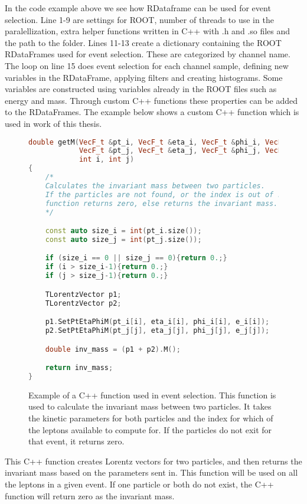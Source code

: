 In the code example above we see how RDataframe can be used for event selection. Line 1-9 are settings for ROOT, 
number of threads to use in the paralellization, extra helper functions written in C++ with .h and .so files and the path to the folder.
Lines 11-13 create a dictionary containing the ROOT RDataFrames used for event selection. These are categorized by channel name. 
The loop on line 15 does event selection for each channel sample, defining new variables in the RDataFrame, applying filters and creating histograms.
Some variables are constructed using variables already in the ROOT files such as energy and mass. Through custom C++ functions
these properties can be added to the RDataFrames. The example below shows a custom C++ function which is used in work of this thesis.

\begin{figure}[H]
    \centering
\begin{lstlisting}[language=C++, style=cppstyle, label={code:cpp_func_example}]
double getM(VecF_t &pt_i, VecF_t &eta_i, VecF_t &phi_i, VecF_t &e_i,
            VecF_t &pt_j, VecF_t &eta_j, VecF_t &phi_j, VecF_t &e_j,
            int i, int j)
{
    /* 
    Calculates the invariant mass between two particles.
    If the particles are not found, or the index is out of range,
    function returns zero, else returns the invariant mass.
    */

    const auto size_i = int(pt_i.size());
    const auto size_j = int(pt_j.size());

    if (size_i == 0 || size_j == 0){return 0.;}
    if (i > size_i-1){return 0.;}
    if (j > size_j-1){return 0.;}

    TLorentzVector p1;
    TLorentzVector p2;

    p1.SetPtEtaPhiM(pt_i[i], eta_i[i], phi_i[i], e_i[i]);
    p2.SetPtEtaPhiM(pt_j[j], eta_j[j], phi_j[j], e_j[j]);

    double inv_mass = (p1 + p2).M();

    return inv_mass;
}
\end{lstlisting}
\caption[C++ function example]{Example of a C++ function used in event selection. This function is used to calculate the invariant mass between two particles.
It takes the kinetic parameters for both particles and the index for which of the leptons available to compute for. If the particles do not exit for that event, it returns zero.  }
\end{figure}
This C++ function creates Lorentz vectors for two particles, and then returns the invariant mass based on the parameters sent in. 
This function will be used on all the leptons in a given event. If one particle or both do not exist, the C++ function will
return zero as the invariant mass. \par


